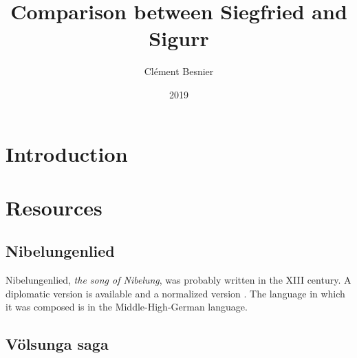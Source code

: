\documentclass{article}
\title{Comparison between Siegfried and Sigur{\dh}r}
\author{Clément Besnier}
\date{2019}
\begin{document}
\maketitle

\section{Introduction}

\section{Resources}
\subsection{Nibelungenlied}
Nibelungenlied, \textit{the song of Nibelung}, was probably written in the XIII century. 
A diplomatic version is available \cite{nibdiplo} and a normalized version  \cite{nibnor}. The language in which it was composed is in the Middle-High-German language.


\subsection{Völsunga saga}

\cite{volsungasaga}


\nocite{*}


\end{document}

